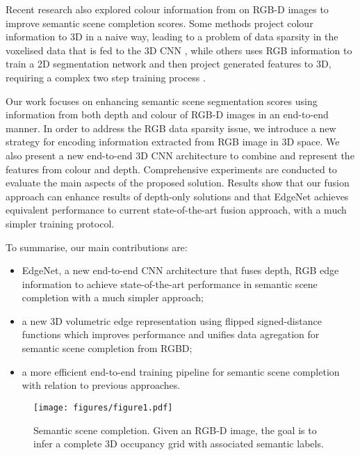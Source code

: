 Recent research also explored colour information from on RGB-D images to improve semantic scene completion scores. Some methods project colour information to 3D in a naive way, leading to a problem of data sparsity in the voxelised data that is fed to the 3D CNN  \cite{guedes_semantic_2018}, while others uses RGB information to train a 2D segmentation network and then project generated features to 3D, requiring a complex two step training process \cite{garbade_two_2018, See_and_think_2018}.

Our work focuses on enhancing semantic scene segmentation scores using information from both depth and colour of RGB-D images in an end-to-end manner. In order to address the RGB data sparsity issue, we introduce a new strategy for encoding information extracted from RGB image in 3D space. We also present a new end-to-end 3D CNN architecture to combine and represent the features from colour and depth. Comprehensive experiments are conducted to evaluate the main aspects of the proposed solution. Results show that our fusion approach can enhance results of depth-only solutions and that EdgeNet achieves equivalent performance to current state-of-the-art fusion approach, with a much simpler training protocol.

To summarise, our main contributions are:
\begin{itemize}
\itemsep0em 
\item EdgeNet, a new end-to-end CNN architecture that fuses depth, RGB edge information to achieve state-of-the-art performance in semantic scene completion with a much simpler approach;
\item a new 3D volumetric edge representation using flipped signed-distance functions which improves performance and unifies data agregation for semantic scene completion from RGBD;
\item a more efficient end-to-end training pipeline for semantic scene completion with relation to previous approaches.
\end{itemize}

\begin{figure}[t]
\begin{center}
   \texttt{[image: figures/figure1.pdf]}
\end{center}
   \caption{Semantic scene completion. Given an RGB-D image, the goal is to infer a complete 3D occupancy grid with associated semantic labels.}
\label{fig:1}
\end{figure}


